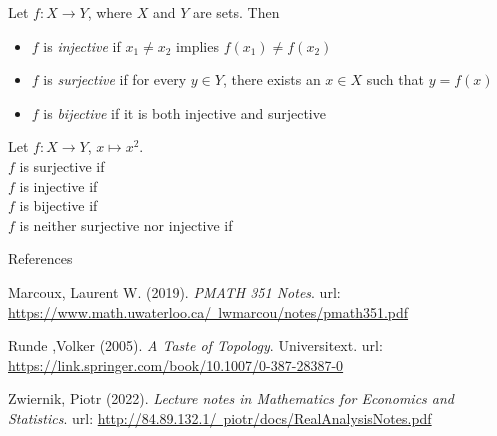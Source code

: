 \documentclass [aspectratio=169, handout]{beamer}
\begin{document}
\begin{frame}
\begin{definition}
Let $f:X \to Y$, where $X$ and $Y$ are sets. Then
\begin{itemize}
    \item $f$ is \emph{injective} if $x_1 \neq x_2$ implies $f(x_1) \neq f(x_2)$
    \item $f$ is \emph{surjective} if for every $y \in Y$, there exists an $x \in X$ such that $y = f(x)$
    \item $f$ is \emph{bijective} if it is both injective and surjective
\end{itemize}
\end{definition}

\begin{example}
Let $f:X \to Y$, $ x \mapsto x^2$. \\
$f$ is surjective if \\
$f$ is injective if \\
$f$ is bijective if \\
$f$ is neither surjective nor injective if
\end{example}
\end{frame}


\begin{frame}{References}

Marcoux, Laurent W. (2019). \textit{PMATH 351 Notes}. url: \href{https://www.math.uwaterloo.ca/~lwmarcou/notes/pmath351.pdf}{https://www.math.uwaterloo.ca/~lwmarcou/notes/pmath351.pdf}

\vspace{1em}


Runde ,Volker (2005). \textit{A Taste of Topology}. Universitext.  url:  \href{https://link.springer.com/book/10.1007/0-387-28387-0}{https://link.springer.com/book/10.1007/0-387-28387-0} 

\vspace{1em}

Zwiernik, Piotr (2022). \textit{Lecture notes in Mathematics for Economics and Statistics}. url: \href{http://84.89.132.1/~piotr/docs/RealAnalysisNotes.pdf}{http://84.89.132.1/~piotr/docs/RealAnalysisNotes.pdf} \\




\end{frame}
\end{document}
